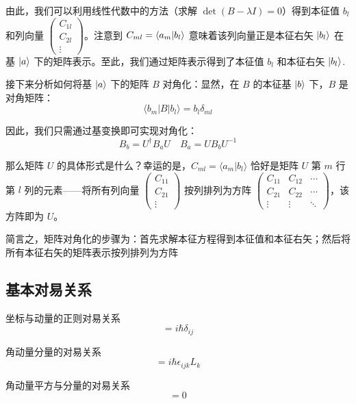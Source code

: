 由此，我们可以利用线性代数中的方法（求解 $\det(B - \lambda I) = 0$）得到本征值 $b_{l}$ 和列向量 $\begin{pmatrix} C_{1 l} \\ C_{2 l} \\ \vdots \end{pmatrix}$。注意到 $C_{m l} = \braket{a_{m}}{b_{l}}$ 意味着该列向量正是本征右矢 $\ket{b_{l}}$ 在基 $\ket{a}$ 下的矩阵表示。至此，我们通过矩阵表示得到了本征值 $b_{l}$ 和本征右矢 $\ket{b_{l}}$.

接下来分析如何将基 $\ket{a}$ 下的矩阵 $B$ 对角化：显然，在 $B$ 的本征基 $\ket{b}$ 下，$B$ 是对角矩阵：
\begin{equation}
	\langle b_m | B | b_l \rangle = b_l \delta_{ml}
\end{equation}

因此，我们只需通过基变换即可实现对角化：
\begin{equation}
	B_b = U^\dagger B_a U \quad B_a = U B_b U^{-1}
\end{equation}

那么矩阵 $U$ 的具体形式是什么？幸运的是，$C_{m l} = \langle a_m | b_l \rangle$ 恰好是矩阵 $U$ 第 $m$ 行第 $l$ 列的元素——将所有列向量 $\begin{pmatrix} C_{1 1} \\ C_{2 1} \\ \vdots \end{pmatrix}$ 按列排列为方阵 $\begin{pmatrix} C_{1 1} & C_{1 2} & \cdots \\ C_{2 1} & C_{2 2} & \cdots \\ \vdots & \vdots & \ddots \end{pmatrix}$，该方阵即为 $U$。

简言之，矩阵对角化的步骤为：首先求解本征方程得到本征值和本征右矢；然后将所有本征右矢的矩阵表示按列排列为方阵 

\subsection{基本对易关系}
坐标与动量的正则对易关系
\begin{equation}
	[x_i, p_j] = i\hbar \delta_{ij}
\end{equation}

角动量分量的对易关系
\begin{equation}
	[L_i, L_j] = i\hbar \epsilon_{ijk} L_k
\end{equation}

角动量平方与分量的对易关系
\begin{equation}
	[L^2, L_i] = 0
\end{equation}

